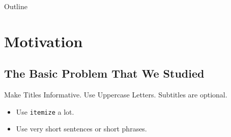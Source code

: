 \documentclass[aspectratio=1610]{beamer}
\title[Short Paper Title] %
{\titulo}
\subtitle{\subtitulo}
\author[] %
{\autor\inst{1} } %
\institute[] %
{
  \inst{1}%
  Department of Something\\
  University of Great Creations and Magic}
\date[] %
{DATE HERE}
\begin{document}
\begin{frame}
  \titlepage 
  \end{frame}

\begin{frame}{Outline}
  \tableofcontents
\end{frame}




% 

\section{Motivation} 
\subsection{The Basic Problem That We Studied}

\begin{frame}{Make Titles Informative. Use Uppercase Letters.}
  {Subtitles are optional.}

  \begin{itemize}
  \item
    Use \texttt{itemize} a lot.
  \item
    Use very short sentences or short phrases.
  \end{itemize}
\end{frame}
\end{document}
